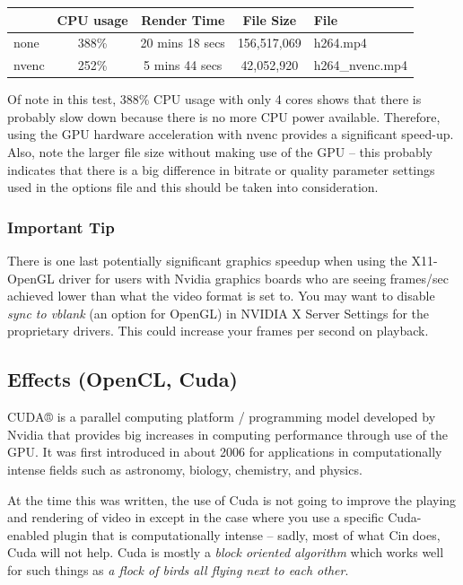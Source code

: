\begin{center}
	\begin{tabular}{l|cccl}
		&CPU usage & Render Time & File Size & File \\
		\hline
		none & 388\% &20 mins 18 secs & 156,517,069 & h264.mp4 \\
		nvenc & 252\% & 5 mins 44 secs & 42,052,920 & h264\_nvenc.mp4 \\
	\end{tabular}
\end{center}

Of note in this test, 388\% CPU usage with only 4 cores shows that there is probably slow down because there is no more CPU power available. Therefore, using the GPU hardware acceleration with nvenc provides a significant speed-up.  Also, note the larger file size without making use of the GPU – this probably indicates that there is a big difference in bitrate or quality parameter settings used in the options file and this should be taken into consideration.

\subsubsection*{Important Tip}%
\label{ssub:important_tip}

There is one last potentially significant graphics speedup when using the X11-OpenGL driver for users with Nvidia graphics boards who are seeing frames/sec achieved lower than what the video format is set to.  You may want to disable \textit{sync to vblank} (an option for OpenGL) in NVIDIA X Server Settings for the proprietary drivers.  This could increase your frames per second on playback.

\subsection{Effects (OpenCL, Cuda)}%
\label{sub:effects_opencl_cuda}

CUDA® is a parallel computing platform / programming model developed by Nvidia that provides big increases in computing performance through use of the GPU. It was first introduced in about 2006 for applications in computationally intense fields such as astronomy, biology, chemistry, and physics.

At the time this was written, the use of Cuda is not going to improve the playing and rendering of video in \CGG{} except in the case where you use a specific Cuda-enabled plugin that is computationally intense -- sadly, most of what Cin does, Cuda will not help.  Cuda is mostly a \textit{block oriented algorithm} which works well for such things as \textit{a flock of birds all flying next to each other}.

